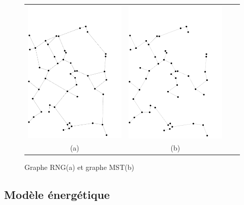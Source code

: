 \begin{figure}[tb]
    \centering
    \begin{tabular}{cccc}
      
      \includegraphics[angle=90, scale= 0.5,width=.5\linewidth]{Etat_de_l'art/source/GrapheRNG.pdf} &
      \includegraphics[angle=90, scale= 0.5,width=.5\linewidth]{Etat_de_l'art/source/GrapheMST.pdf} 
   \\
      (a) & (b) \\
    \end{tabular}
    \caption{Graphe RNG(a) et graphe MST(b) \label{fig:ex}}
\end{figure}


\subsection{Modèle énergétique}
